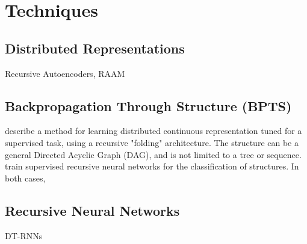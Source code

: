 \documentclass[11pt]{article}
\begin{document}
\section{Techniques}

\subsection{Distributed Representations}
Recursive Autoencoders, RAAM
\subsection{Backpropagation Through Structure (BPTS)}
\cite{goller1996learning} describe a method for learning distributed continuous representation tuned for a supervised task, using a recursive "folding" architecture. The structure can be a general Directed Acyclic Graph (DAG), and is not limited to a tree or sequence. \cite{sperduti1997supervised} train supervised recursive neural networks for the classification of structures. In both cases, 
\subsection{Recursive Neural Networks}
DT-RNNs


{}

\end{document}
